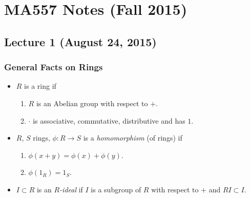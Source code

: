 \chapter{MA557 Notes (Fall 2015)}
\section{Lecture 1 (August 24, 2015)}
\subsection{General Facts on Rings}
\begin{itemize}[noitemsep]
\item $R$ is a ring if
  \begin{enumerate}[noitemsep,label=(\roman*)]
  \item $R$ is an Abelian group with respect to $+$.
  \item $\cdot$ is associative, commutative, distributive and has
    $1$.
  \end{enumerate}
\item $R$, $S$ rings, $\phi\colon R\to S$ is a
  \emph{homomorphism} (of rings) if
  \begin{enumerate}[noitemsep,label=(\roman*)]
  \item $\phi(x+y)=\phi(x)+\phi(y)$.
  \item $\phi(1_R)=1_S$.
  \end{enumerate}
\item $I\subset R$ is an \emph{$R$-ideal} if $I$ is a subgroup of
  $R$ with respect to $+$ and $RI\subset I$.
\end{itemize}

